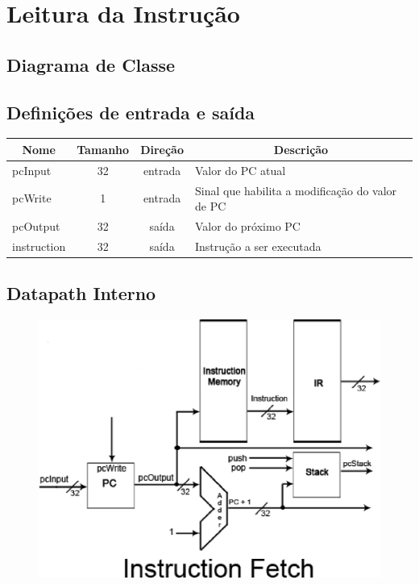 \section{Leitura da Instrução}
	\subsection{Diagrama de Classe}
  \begin{figure}[h!]
    
  \end{figure}
		
		\subsection{Definições de entrada e saída}
		
	\begin{center}
		\begin{longtable}[pos]{| l | c | c | m{7cm} |} \hline
			\multicolumn{1}{|c|}{\cellcolor[gray]{0.9}\textbf{Nome}} & 
			\multicolumn{1}{c|}{\cellcolor[gray]{0.9}\textbf{Tamanho}} & 
			\multicolumn{1}{c|}{\cellcolor[gray]{0.9}\textbf{Direção}} &
			\multicolumn{1}{c|}{\cellcolor[gray]{0.9}\textbf{Descrição}} \\ \hline
			\endhead
			\hline
			\endlastfoot
			pcInput & 32 & entrada & Valor do PC atual\\ \hline
			pcWrite & 1 & entrada & Sinal que habilita a modificação do valor de PC \\ \hline
			pcOutput & 32 & saída & Valor do próximo PC \\ \hline
			instruction & 32 & saída & Instrução a ser executada \\ \hline
			
		\end{longtable}
	\end{center}
	
	\newpage
	
	\subsection{Datapath Interno}
	\begin{figure}[htpb!]
		\begin{center}
		\includegraphics[scale=0.8]{./datapath/step1.eps}
		\end{center}
	\end{figure}
	